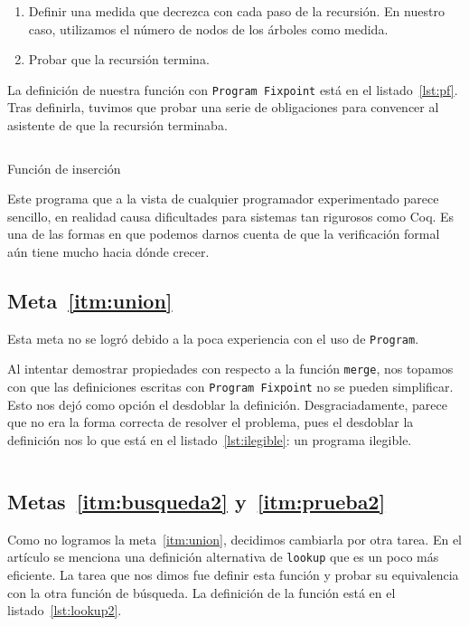 \documentclass[11pt,letterpaper]{article}
\begin{document}
\begin{enumerate}
\item Definir una medida que decrezca con cada paso de la recursión. En nuestro caso, utilizamos el número de nodos de los árboles como medida.
\item Probar que la recursión termina.
\end{enumerate}

La definición de nuestra función con \texttt{Program Fixpoint} está en el listado~\ref{lst:pf}. Tras definirla, tuvimos que probar una serie de obligaciones para convencer al asistente de que la recursión terminaba.

\begin{listing}[H]
  \inputminted{coq}{src/ProgramFixpoint.v}
  \caption{Función de inserción}
  \label{lst:pf}
\end{listing}


Este programa que a la vista de cualquier programador experimentado parece sencillo, en realidad causa dificultades para sistemas tan rigurosos como Coq. Es una de las formas en que podemos darnos cuenta de que la verificación formal aún tiene mucho hacia dónde crecer.

\subsection{Meta~\ref{itm:union}}
\noindent Esta meta no se logró debido a la poca experiencia con el uso de \texttt{Program}.

Al intentar demostrar propiedades con respecto a la función \texttt{merge}, nos topamos con que las definiciones escritas con \texttt{Program Fixpoint} no se pueden simplificar. Esto nos dejó como opción el desdoblar la definición. Desgraciadamente, parece que no era la forma correcta de resolver el problema, pues el desdoblar la definición nos lo que está en el listado~\ref{lst:ilegible}: un programa ilegible.

  \inputminted{coq}{src/ilegible.v}
  \subsection{Metas~\ref{itm:busqueda2} y~\ref{itm:prueba2}}
  \noindent Como no logramos la meta~\ref{itm:union}, decidimos cambiarla por otra tarea. En el artículo se menciona una definición alternativa de \texttt{lookup} que es un poco más eficiente. La tarea que nos dimos fue definir esta función y probar su equivalencia con la otra función de búsqueda. La definición de la función está en el listado~\ref{lst:lookup2}.
\end{document}
